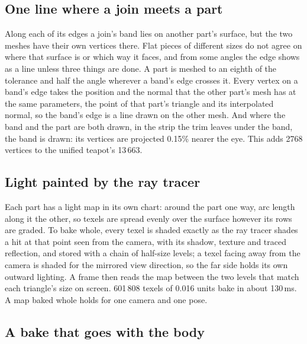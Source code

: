 \documentclass[journal]{IEEEtran}
\begin{document}
\subsection{One line where a join meets a part}

Along each of its edges a join's band lies on another part's surface,
but the two meshes have their own vertices there. Flat pieces of
different sizes do not agree on where that surface is or which way it
faces, and from some angles the edge shows as a line unless three things are
done. A part is meshed to an eighth of the tolerance and half the
angle wherever a band's edge crosses it. Every vertex on a band's edge
takes the position and the normal that the other part's mesh has at the
same parameters, the point of that part's triangle and its interpolated
normal, so the band's edge is a line drawn on the other mesh. And where
the band and the part are both drawn, in the strip the trim leaves
under the band, the band is drawn: its vertices are projected 0.15\%
nearer the eye. This adds 2768 vertices to the unified teapot's 13\,663.

\subsection{Light painted by the ray tracer}

Each part has a light map in its own chart: around the part one way,
arc length along it the other, so texels are spread evenly over the
surface however its rows are graded. To bake whole, every texel is
shaded exactly as the ray tracer shades a hit at that point seen from
the camera, with its shadow, texture and traced reflection, and stored
with a chain of half-size levels; a texel facing away from the camera
is shaded for the mirrored view direction, so the far side holds its own
outward lighting. A frame then reads the map between the two levels
that match each triangle's size on screen. 601\,808 texels of 0.016
units bake in about 130\,ms. A map baked whole holds for one camera and
one pose.

\subsection{A bake that goes with the body}
\label{sec:posefree}
\end{document}
